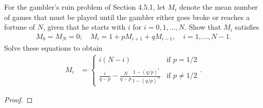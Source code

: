 \begin{problem}{4.59}
  For the gambler's ruin problem of Section 4.5.1, let $M_i$ denote the mean number
  of games that must be played until the gambler either goes broke or reaches a
  fortune of $N$, given that he starts with $i$ for $i=0,1,\dots, N$. Show that
  $M_i$ satisfies
  \begin{align*}
    M_0 = M_N = 0; \quad M_i = 1 + p M_{i+1} + q M_{i-1}, \quad i=1,\dots, N - 1.
  \end{align*}
  Solve these equations to obtain
  \begin{align*}
    M_i &=
    \begin{cases}
      i(N-i) & \text{if $p = 1/2$} \\
      \displaystyle \frac{i}{q-p} - \frac{N}{q-p}\frac{1-(q/p)^i}{1- (q/p)^N} & \text{if $p \neq 1/2$}
    \end{cases}.
  \end{align*}
\end{problem}

\begin{proof}
\end{proof}
\newpage

